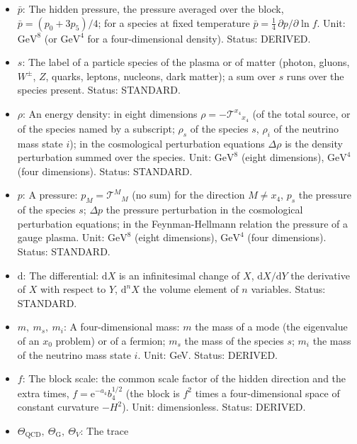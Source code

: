 \documentclass[
  10pt,
]{article}
\providecommand{\tightlist}{%
  \setlength{\itemsep}{0pt}\setlength{\parskip}{0pt}}
\begin{document}
\begin{itemize}
\tightlist
\item
  \(\bar p\): The hidden pressure, the pressure averaged over the block,
  \(\bar p = (p_0 + 3p_5)/4\); for a species at fixed temperature
  \(\bar p = \frac14\,\partial p/\partial\ln f\). Unit:
  \(\mathrm{GeV}^{8}\) (or \(\mathrm{GeV}^{4}\) for a four-dimensional
  density). Status: DERIVED.
\item
  \(s\): The label of a particle species of the plasma or of matter
  (photon, gluons, \(W^\pm\), \(Z\), quarks, leptons, nucleons, dark
  matter); a sum over \(s\) runs over the species present. Status:
  STANDARD.
\item
  \(\rho\): An energy density: in eight dimensions
  \(\rho = -\mathcal{T}^{x_4}{}_{x_4}\) (of the total source, or of the
  species named by a subscript; \(\rho_s\) of the species \(s\),
  \(\rho_i\) of the neutrino mass state \(i\)); in the cosmological
  perturbation equations \(\Delta\rho\) is the density perturbation
  summed over the species. Unit: \(\mathrm{GeV}^{8}\) (eight
  dimensions), \(\mathrm{GeV}^{4}\) (four dimensions). Status: STANDARD.
\item
  \(p\): A pressure: \(p_M = \mathcal{T}^M{}_M\) (no sum) for the
  direction \(M \ne x_4\), \(p_s\) the pressure of the species \(s\);
  \(\Delta p\) the pressure perturbation in the cosmological
  perturbation equations; in the Feynman-Hellmann relation the pressure
  of a gauge plasma. Unit: \(\mathrm{GeV}^{8}\) (eight dimensions),
  \(\mathrm{GeV}^{4}\) (four dimensions). Status: STANDARD.
\item
  \(\mathrm{d}\): The differential: \(\mathrm{d}X\) is an infinitesimal
  change of \(X\), \(\mathrm{d}X/\mathrm{d}Y\) the derivative of \(X\)
  with respect to \(Y\), \(\mathrm{d}^nX\) the volume element of \(n\)
  variables. Status: STANDARD.
\item
  \(m,\ m_s,\ m_i\): A four-dimensional mass: \(m\) the mass of a mode
  (the eigenvalue of an \(x_0\) problem) or of a fermion; \(m_s\) the
  mass of the species \(s\); \(m_i\) the mass of the neutrino mass state
  \(i\). Unit: GeV. Status: DERIVED.
\item
  \(f\): The block scale: the common scale factor of the hidden
  direction and the extra times, \(f = \mathrm{e}^{-a_4}b_4^{1/2}\) (the
  block is \(f^2\) times a four-dimensional space of constant curvature
  \(-H^2\)). Unit: dimensionless. Status: DERIVED.
\item
  \(\Theta_{\mathrm{QCD}},\ \Theta_{\mathrm{G}},\ \Theta_V\): The trace

\end{itemize}
\end{document}
